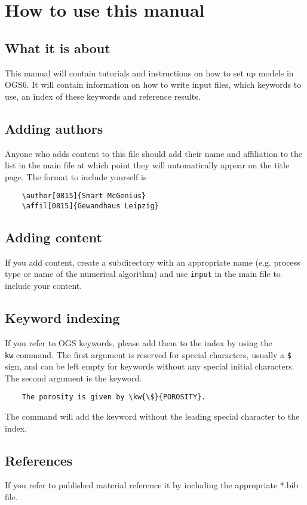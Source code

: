 \chapter{How to use this manual}

\section{What it is about}
This manual will contain tutorials and instructions on how to set up models in OGS6. It will contain information on how to write input files, which keywords to use, an index of these keywords and reference results.

\section{Adding authors}
Anyone who adds content to this file should add their name and affiliation to the list in the main file at which point they will automatically appear on the title page. The format to include yourself is 
\begin{verbatim}
	\author[0815]{Smart McGenius}
	\affil[0815]{Gewandhaus Leipzig}
\end{verbatim}

\section{Adding content}
If you add content, create a subdirectory with an appropriate name (e.g. process type or name of the numerical algorithm) and use \texttt{input} in the main file to include your content.

\section{Keyword indexing}
If you refer to OGS keywords, please add them to the index by using the \texttt{\\kw} command. The first argument is reserved for special characters, usually a \texttt{\$} sign, and can be left empty for keywords without any special initial characters. The second argument is the keyword.
\begin{verbatim}
	The porosity is given by \kw{\$}{POROSITY}. 
\end{verbatim}
The command will add the keyword without the leading special character to the index.

\section{References}
If you refer to published material reference it by including the appropriate *.bib file.

